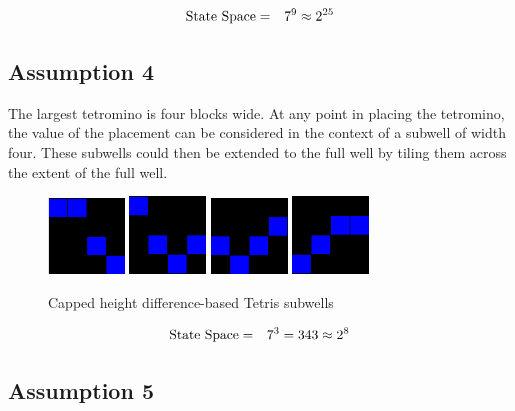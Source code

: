 \documentclass{rucsthesis}
\begin{document}
\begin{eqnarray*}
\centering
\textrm{State Space} & = & 7^{9} \approx 2^{25}
\end{eqnarray*}

\subsection*{Assumption 4}

The largest tetromino is four blocks wide. At any point in placing the tetromino, the value of the placement can be considered in the context of a subwell of width four. These subwells could then be extended to the full well by tiling them across the extent of the full well.

\begin{figure}[h]
\centering
\includegraphics[width=0.8in]{reducedwell.png}
\includegraphics[width=0.8in]{reducedwell2.png}
\includegraphics[width=0.8in]{reducedwell3.png}
\includegraphics[width=0.8in]{reducedwell4.png}
\caption{Capped height difference-based Tetris subwells}
\label{fig:redwell}
\end{figure}

\begin{eqnarray*}
\centering
\textrm{State Space} & = & 7^{3} = 343 \approx 2^{8}
\end{eqnarray*}

\subsection*{Assumption 5}
\end{document}
